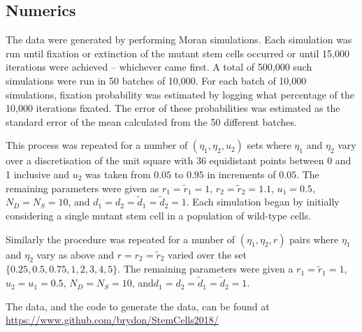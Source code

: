 \documentclass[12pt]{article}
\begin{document}
\begin{appendices}

\section{Numerics}\label{exp}


The data were generated by performing Moran simulations. Each simulation was run until fixation or extinction of the mutant stem cells occurred or until 15,000 iterations were achieved -- whichever came first. A total of 500,000 such simulations were run in 50 batches of 10,000. For each batch of 10,000 simulations, fixation probability was estimated by logging what percentage of the 10,000 iterations fixated. The error of these probabilities was estimated as the standard error of the mean calculated from the 50 different batches. 

This process was repeated for a number of $(\eta_1, \eta_2, u_2)$ sets where $\eta_1$ and $\eta_2$ vary over a discretisation of the unit square with 36 equidistant points between 0 and 1 inclusive and $u_2$ was taken from $0.05$ to $0.95$ in increments of $0.05$. The remaining parameters were given as $r_1=\tilde{r}_1=1$, $r_2=\tilde{r}_2=1.1$, $u_1=0.5$, $N_D=N_S=10$, and $d_1=d_2=\tilde{d}_1=\tilde{d}_2=1$. Each simulation began by initially considering a single mutant stem cell in a population of wild-type cells.

Similarly the procedure was repeated for a number of $(\eta_1, \eta_2, r)$ pairs where $\eta_1$ and $\eta_2$ vary as above and $r=r_2=\tilde{r}_2$ varied over the set $\{0.25, 0.5, 0.75, 1, 2, 3, 4, 5\}$. The remaining parameters were given a $r_1=\tilde{r}_1=1$, $u_2=u_1=0.5$, $N_D=N_S=10$, and$d_1=d_2=\tilde{d}_1=\tilde{d}_2=1$.

The data, and the code to generate the data, can be found at \url{https://www.github.com/brydon/StemCells2018/}

\end{appendices}



\end{document}
